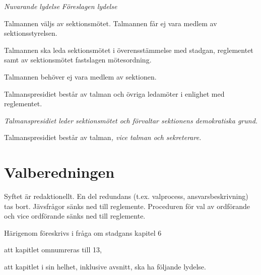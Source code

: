 \documentclass{article}
\newenvironment{lydelse}
    {\begin{paracol}{2}%
        \emph{Nuvarande lydelse}%
        \switchcolumn%
        \emph{Föreslagen lydelse}%
    \end{paracol}%
    \begin{enumerate}[label=\thesubsection.\arabic*]%
    \begin{paracol}{2}%
    }{\end{paracol}\end{enumerate}}
\begin{document}
\begin{lydelse}
  \setcounter{section}{5}
  \setcounter{subsection}{9}
  \item Talmannen väljs av sektionsmötet. Talmannen får ej vara medlem av sektionsstyrelsen.
  \item Talmannen ska leda sektionsmötet i överensstämmelse med stadgan, reglementet samt av sektionsmötet fastslagen mötesordning.
  \item Talmannen behöver ej vara medlem av sektionen.
  \item Talmanspresidiet består av talman och övriga ledamöter i enlighet med reglementet.
\switchcolumn
  \item \emph{Talmanspresidiet leder sektionsmötet och förvaltar sektionens demokratiska grund.}
  \item Talmanspresidiet består av talman\emph{, vice talman och sekreterare.}
\end{lydelse}
\setcounter{section}{12}

\section{Valberedningen}
Syftet är redaktionellt.
En del redundans (t.ex. valprocess, ansvarsbeskrivning) tas bort.
Jävsfrågor sänks ned till reglemente.
Proceduren för val av ordförande och vice ordförande sänks ned till reglemente.

Härigenom föreskrivs i fråga om stadgans kapitel 6
\begin{dels}
  \item att kapitlet omnumreras till 13,
  \item att kapitlet i sin helhet, inklusive avsnitt, ska ha följande lydelse.
\end{dels}
\end{document}
